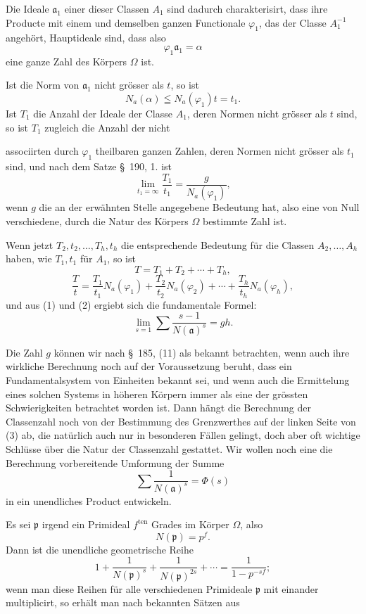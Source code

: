 \documentclass[11pt]{article}
\begin{document}
Die Ideale $\mathfrak a_1$ einer dieser Classen $A_1$ sind dadurch charakterisirt, dass ihre Producte mit einem und demselben ganzen Functionale $\varphi_1$, das der Classe $A_1^{-1}$ angehört, Hauptideale sind, dass also
\[
\varphi_1\mathfrak a_1=\alpha
\]
eine ganze Zahl des Körpers $\Omega$ ist.

Ist die Norm von $\mathfrak a_1$ nicht grösser als $t$, so ist
\[
N_a(\alpha)\leqq N_a(\varphi_1)t=t_1.
\]
Ist $T_1$ die Anzahl der Ideale der Classe $A_1$, deren Normen nicht grösser als $t$ sind, so ist $T_1$ zugleich die Anzahl der nicht

associirten durch $\varphi_1$ theilbaren ganzen Zahlen, deren Normen nicht grösser als $t_1$ sind, und nach dem Satze \S~190, 1. ist
\begin{equation}
\lim_{t_1=\infty}\frac{T_1}{t_1}=\frac{g}{N_a(\varphi_1)},
\tag{2}
\end{equation}
wenn $g$ die an der erwähnten Stelle angegebene Bedeutung hat, also eine von Null verschiedene, durch die Natur des Körpers $\Omega$ bestimmte Zahl ist.

Wenn jetzt $T_2,t_2,\ldots,T_h,t_h$ die entsprechende Bedeutung für die Classen $A_2,\ldots,A_h$ haben, wie $T_1,t_1$ für $A_1$, so ist
\[
T=T_1+T_2+\cdots+T_h,
\]
\[
\frac{T}{t}=\frac{T_1}{t_1}N_a(\varphi_1)+\frac{T_2}{t_2}N_a(\varphi_2)+\cdots+
\frac{T_h}{t_h}N_a(\varphi_h),
\]
und aus (1) und (2) ergiebt sich die fundamentale Formel:
\begin{equation}
\lim_{s=1}\sum\frac{s-1}{N(\mathfrak a)^s}=gh.
\tag{3}
\end{equation}

Die Zahl $g$ können wir nach \S~185, (11) als bekannt betrachten, wenn auch ihre wirkliche Berechnung noch auf der Voraussetzung beruht, dass ein Fundamentalsystem von Einheiten bekannt sei, und wenn auch die Ermittelung eines solchen Systems in höheren Körpern immer als eine der grössten Schwierigkeiten betrachtet worden ist. Dann hängt die Berechnung der Classenzahl noch von der Bestimmung des Grenzwerthes auf der linken Seite von (3) ab, die natürlich auch nur in besonderen Fällen gelingt, doch aber oft wichtige Schlüsse über die Natur der Classenzahl gestattet. Wir wollen noch eine die Berechnung vorbereitende Umformung der Summe
\begin{equation}
\sum\frac1{N(\mathfrak a)^s}=\Phi(s)
\tag{4}
\end{equation}
in ein unendliches Product entwickeln.

Es sei $\mathfrak p$ irgend ein Primideal $f^{\mathrm{ten}}$ Grades im Körper $\Omega$, also
\[
N(\mathfrak p)=p^f.
\]
Dann ist die unendliche geometrische Reihe
\[
1+\frac1{N(\mathfrak p)^s}+\frac1{N(\mathfrak p)^{2s}}+\cdots
=\frac1{1-p^{-sf}};
\]
wenn man diese Reihen für alle verschiedenen Primideale $\mathfrak p$ mit einander multiplicirt, so erhält man nach bekannten Sätzen aus
\end{document}
